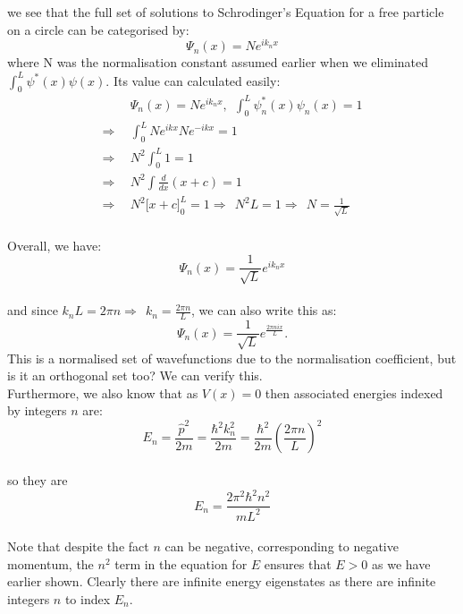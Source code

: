 \\\\
we see that the full set of solutions to Schrodinger's Equation for a free particle on a circle can be categorised by:
$$
\Psi_n(x)= Ne^{ik_n x}
$$
where N was the normalisation constant assumed earlier when we eliminated $\int_{0}^{L}\psi^\ast(x)\psi(x)$. Its value can calculated easily:
$$
\begin{aligned}
&\Psi_n(x)= Ne^{ik_n x}, \:\: \int_{0}^{L}\psi_n^\ast(x)\psi_n(x)=1\\
\Rightarrow\:\: &\int_{0}^{L}Ne^{ikx}Ne^{-ikx} = 1\\
\Rightarrow\:\: &N^2\int_{0}^{L}1 = 1\\
\Rightarrow\:\: &N^2\int\frac{d}{dx}(x+c)=1\\
\Rightarrow\:\: &N^2\biggl[x+c\biggr]_{0}^{L} = 1 \Rightarrow\:\: N^2L = 1 \Rightarrow\:\: N= \frac{1}{\sqrt{L}}
\end{aligned}
$$
\\
Overall, we have:
$$
\Psi_n(x)=\frac{1}{\sqrt{L}}e^{ik_nx}
$$
\\
and since $k_nL=2\pi n \Rightarrow\:\: k_n=\frac{2\pi n}{L}$, we can also write this as:
$$
\Psi_n(x)=\frac{1}{\sqrt{L}}e^{\frac{2\pi nix}{L}}.
$$
This is a normalised set of wavefunctions due to the normalisation coefficient, but is it an orthogonal set too? We can verify this.
\\
Furthermore, we also know that as $V(x)=0$ then associated energies indexed by integers $n$ are:
$$
E_n = \frac{\hat{p}^2}{2m} = \frac{\hbar^2k_n^2}{2m} = \frac{\hbar^2}{2m}\left(\frac{2\pi n}{L}\right)^2
$$
\\
so they are
$$
E_n=\frac{2\pi^2\hbar^2n^2}{mL^2}
$$
\\
Note that despite the fact $n$ can be negative, corresponding to negative momentum, the $n^2$ term in the equation  for $E$ ensures that $E > 0$ as we have earlier shown. Clearly there are infinite energy eigenstates as there are infinite integers $n$ to index $E_n$.
